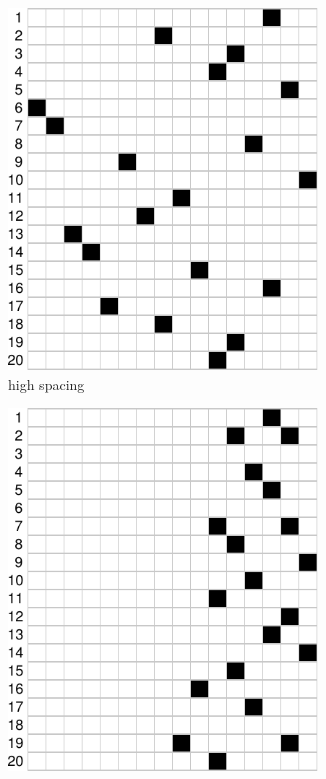 \documentclass[table,color]{fithesis3/fithesis3}
\begin{document}
\begin{figure}
	\begin{subfigure}[b]{.5\textwidth}
		\centering
		\includegraphics[width=0.9\textwidth]{figure/practice_progress_a}
		\caption{high spacing}
		\label{figure:practice_progress_a}
	\end{subfigure}
	\begin{subfigure}[b]{.5\textwidth}
		\centering
		\includegraphics[width=0.9\textwidth]{figure/practice_progress_b}

\end{subfigure}
\end{figure}
\end{document}
